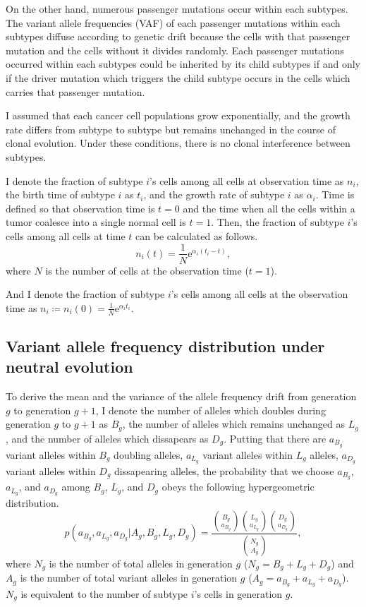 \documentclass[12pt]{article}
\newcommand{\napier}{\mathrm{e}}
\begin{document}
On the other hand, numerous passenger mutations occur within each subtypes. The variant allele frequencies (VAF) of each passenger mutations within each subtypes diffuse according to genetic drift because the cells with that passenger mutation and the cells without it divides randomly. Each passenger mutations occurred within each subtypes could be inherited by its child subtypes if and only if the driver mutation which triggers the child subtype occurs in the cells which carries that passenger mutation.

I assumed that each cancer cell populations grow exponentially, and the growth rate differs from subtype to subtype but remains unchanged in the course of clonal evolution. Under these conditions, there is no clonal interference between subtypes.

I denote the fraction of subtype $i$'s cells among all cells at observation time as $n_i$, the birth time of subtype $i$ as $t_i$, and the growth rate of subtype $i$ as $\alpha_i$.
Time is defined so that observation time is $t=0$ and the time when all the cells within a tumor coalesce into a single normal cell is $t=1$.
Then, the fraction of subtype $i$'s cells among all cells at time $t$ can be calculated as follows.
\begin{equation}
 n_i(t) = \frac{1}{N}\napier^{\alpha_i (t_i - t)},
\end{equation}
where $N$ is the number of cells at the observation time ($t=1$).

And I denote the fraction of subtype $i$'s cells among all cells at the observation time as $n_i \coloneqq n_i(0) = \frac{1}{N}\napier^{\alpha_i t_i}$.

\subsection{Variant allele frequency distribution under neutral evolution}
To derive the mean and the variance of the allele frequency drift from generation $g$ to generation $g+1$, I denote the number of alleles which doubles during generation $g$ to $g+1$ as $B_g$, the number of alleles which remains unchanged as $L_g$, and the number of alleles which dissapears as $D_g$. Putting that there are $a_{B_g}$ variant alleles within $B_g$ doubling alleles, $a_{L_g}$ variant alleles within $L_g$ alleles, $a_{D_g}$ variant alleles within $D_g$ dissapearing alleles, the probability that we choose $a_{B_g}$, $a_{L_g}$, and $a_{D_g}$ among $B_g$, $L_g$, and $D_g$ obeys the following hypergeometric distribution.
\begin{equation}
 p(a_{B_g}, a_{L_g}, a_{D_g} | A_g, B_g, L_g, D_g) = \frac{{B_g \choose a_{B_g}}{L_g \choose a_{L_g}}{D_g \choose a_{D_g}}}{{N_g \choose A_g}},
\end{equation}
where $N_g$ is the number of total alleles in generation $g$ ($N_g = B_g + L_g + D_g$) and $A_g$ is the number of total variant alleles in generation $g$ ($A_g = a_{B_g} + a_{L_g} + a_{D_g}$).
$N_g$ is equivalent to the number of subtype $i$'s cells in generation $g$.
\end{document}
